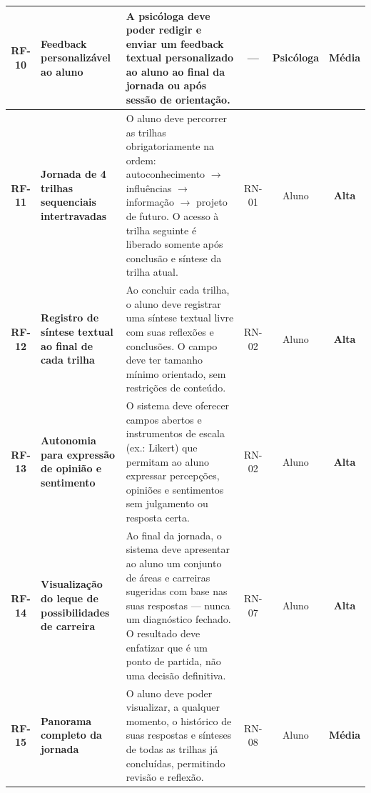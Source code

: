 {\begin{longtable}{|c|p{2.5cm}|p{4.5cm}|c|c|c|}
    \textcolor{blue!70!black}{\textbf{RF-10}} & 
    \textbf{Feedback personalizável ao aluno} & 
    A psicóloga deve poder redigir e enviar um feedback textual personalizado ao aluno ao final da jornada ou após sessão de orientação. & 
    --- & 
    Psicóloga & 
    \textcolor{orange!80!black}{\textbf{Média}} \\
    \hline

    \textcolor{blue!70!black}{\textbf{RF-11}} & 
    \textbf{Jornada de 4 trilhas sequenciais intertravadas} & 
    O aluno deve percorrer as trilhas obrigatoriamente na ordem: autoconhecimento $\rightarrow$ influências $\rightarrow$ informação $\rightarrow$ projeto de futuro. O acesso à trilha seguinte é liberado somente após conclusão e síntese da trilha atual. & 
    RN-01 & 
    Aluno & 
    \textcolor{red!80!black}{\textbf{Alta}} \\
    \hline

    \textcolor{blue!70!black}{\textbf{RF-12}} & 
    \textbf{Registro de síntese textual ao final de cada trilha} & 
    Ao concluir cada trilha, o aluno deve registrar uma síntese textual livre com suas reflexões e conclusões. O campo deve ter tamanho mínimo orientado, sem restrições de conteúdo. & 
    RN-02 & 
    Aluno & 
    \textcolor{red!80!black}{\textbf{Alta}} \\
    \hline

    \textcolor{blue!70!black}{\textbf{RF-13}} & 
    \textbf{Autonomia para expressão de opinião e sentimento} & 
    O sistema deve oferecer campos abertos e instrumentos de escala (ex.: Likert) que permitam ao aluno expressar percepções, opiniões e sentimentos sem julgamento ou resposta certa. & 
    RN-02 & 
    Aluno & 
    \textcolor{red!80!black}{\textbf{Alta}} \\
    \hline

    \textcolor{blue!70!black}{\textbf{RF-14}} & 
    \textbf{Visualização do leque de possibilidades de carreira} & 
    Ao final da jornada, o sistema deve apresentar ao aluno um conjunto de áreas e carreiras sugeridas com base nas suas respostas --- nunca um diagnóstico fechado. O resultado deve enfatizar que é um ponto de partida, não uma decisão definitiva. & 
    RN-07 & 
    Aluno & 
    \textcolor{red!80!black}{\textbf{Alta}} \\
    \hline

    \textcolor{blue!70!black}{\textbf{RF-15}} & 
    \textbf{Panorama completo da jornada} & 
    O aluno deve poder visualizar, a qualquer momento, o histórico de suas respostas e sínteses de todas as trilhas já concluídas, permitindo revisão e reflexão. & 
    RN-08 & 
    Aluno & 
    \textcolor{orange!80!black}{\textbf{Média}} \\
    \hline


\end{longtable}}
